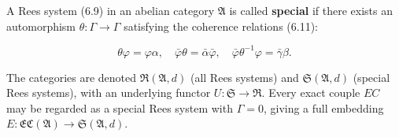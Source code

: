 A Rees system (6.9) in an abelian category $\mathfrak{A}$ is called \textbf{special} if there exists an automorphism $\theta : \Gamma \to \Gamma$ satisfying the coherence relations (6.11):

$$\theta \varphi = \varphi \alpha, \quad \bar{\varphi} \theta = \bar{\alpha} \bar{\varphi}, \quad \bar{\varphi} \theta^{-1} \varphi = \bar{\gamma} \beta.$$

The categories are denoted $\mathfrak{R}(\mathfrak{A}, d)$ (all Rees systems) and $\mathfrak{S}(\mathfrak{A}, d)$ (special Rees systems), with an underlying functor $U : \mathfrak{S} \to \mathfrak{R}$. Every exact couple $EC$ may be regarded as a special Rees system with $\Gamma = 0$, giving a full embedding $E : \mathfrak{EC}(\mathfrak{A}) \to \mathfrak{S}(\mathfrak{A}, d)$.

